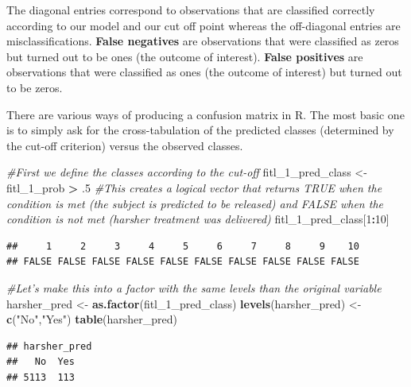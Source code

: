 \documentclass[]{book}
\newenvironment{Shaded}{\begin{snugshade}}{\end{snugshade}}
\newcommand{\CommentTok}[1]{\textcolor[rgb]{0.56,0.35,0.01}{\textit{#1}}}
\newcommand{\DecValTok}[1]{\textcolor[rgb]{0.00,0.00,0.81}{#1}}
\newcommand{\FloatTok}[1]{\textcolor[rgb]{0.00,0.00,0.81}{#1}}
\newcommand{\KeywordTok}[1]{\textcolor[rgb]{0.13,0.29,0.53}{\textbf{#1}}}
\newcommand{\NormalTok}[1]{#1}
\newcommand{\OperatorTok}[1]{\textcolor[rgb]{0.81,0.36,0.00}{\textbf{#1}}}
\newcommand{\StringTok}[1]{\textcolor[rgb]{0.31,0.60,0.02}{#1}}
\theoremstyle{definition}
\theoremstyle{definition}
\theoremstyle{definition}
\theoremstyle{remark}
\begin{document}
The diagonal entries correspond to observations that are classified
correctly according to our model and our cut off point whereas the
off-diagonal entries are misclassifications. \textbf{False negatives}
are observations that were classified as zeros but turned out to be ones
(the outcome of interest). \textbf{False positives} are observations
that were classified as ones (the outcome of interest) but turned out to
be zeros.

There are various ways of producing a confusion matrix in R. The most
basic one is to simply ask for the cross-tabulation of the predicted
classes (determined by the cut-off criterion) versus the observed
classes.

\begin{Shaded}
\begin{Highlighting}[]
\CommentTok{#First we define the classes according to the cut-off}
\NormalTok{fitl_}\DecValTok{1}\NormalTok{_pred_class <-}\StringTok{ }\NormalTok{fitl_}\DecValTok{1}\NormalTok{_prob }\OperatorTok{>}\StringTok{ }\FloatTok{.5}
\CommentTok{#This creates a logical vector that returns TRUE when the condition is met (the subject is predicted to be released) and FALSE when the condition is not met (harsher treatment was delivered)}
\NormalTok{fitl_}\DecValTok{1}\NormalTok{_pred_class[}\DecValTok{1}\OperatorTok{:}\DecValTok{10}\NormalTok{]}
\end{Highlighting}
\end{Shaded}

\begin{verbatim}
##     1     2     3     4     5     6     7     8     9    10 
## FALSE FALSE FALSE FALSE FALSE FALSE FALSE FALSE FALSE FALSE
\end{verbatim}

\begin{Shaded}
\begin{Highlighting}[]
\CommentTok{#Let's make this into a factor with the same levels than the original variable}
\NormalTok{harsher_pred <-}\StringTok{ }\KeywordTok{as.factor}\NormalTok{(fitl_}\DecValTok{1}\NormalTok{_pred_class)}
\KeywordTok{levels}\NormalTok{(harsher_pred) <-}\StringTok{ }\KeywordTok{c}\NormalTok{(}\StringTok{"No"}\NormalTok{,}\StringTok{"Yes"}\NormalTok{)}
\KeywordTok{table}\NormalTok{(harsher_pred)}
\end{Highlighting}
\end{Shaded}

\begin{verbatim}
## harsher_pred
##   No  Yes 
## 5113  113
\end{verbatim}
\end{document}
